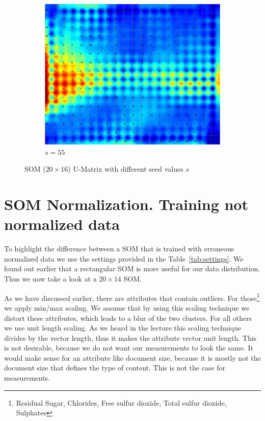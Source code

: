 \documentclass{acm_proc_article-sp}
\begin{document}
\begin{figure}
\begin{subfigure}[b]{0.30\linewidth}
        \includegraphics[width=\linewidth]{img/wine-newmid-u-matrix-seed-55}
        \caption{$s=55$}
    \end{subfigure}
    \caption{SOM ($20\times16$) U-Matrix with different seed values $s$}
    \label{fig:wine-newmid-u-matrix-seed}
\end{figure}

\section{SOM Normalization. Training not normalized data}

To highlight the difference between a SOM that is trained with erroneous normalized data
we use the settings provided in the Table~\ref{tab:settings}. We found out earlier that a rectangular
SOM is more useful for our data distribution. Thus we now take a look at a $20\times14$ SOM.

As we have discussed earlier, there are attributes that contain outliers.
For those\footnote{Residual Sugar, Chlorides, Free sulfur dioxide, Total sulfur dioxide, Sulphates} we apply min/max scaling. We assume that by using this scaling technique we distort these attributes, which leads to a blur of the two clusters.
For all others we use unit length scaling. As we heard in the lecture this scaling technique
divides by the vector length, thus it makes the attribute vector unit length. This is
not desirable, because we do not want our measurements to look the same. It would
make sense for an attribute like document size, because it is mostly not the document
size that defines the type of content. This is not the case for measurements.
\end{document}
